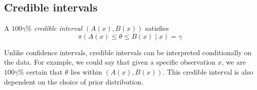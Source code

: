 \subsection{Credible intervals}
\begin{definition}
	A \( 100\gamma \)\% \textit{credible interval} \( (A(x), B(x)) \) satisfies
	\[ \pi(A(x) \leq \theta \leq B(x) \mid x) = \gamma \]
\end{definition}
\begin{remark}
	Unlike confidence intervals, credible intervals can be interpreted conditionally on the data.
	For example, we could say that given a specific observation \( x \), we are \( 100 \gamma \)\% certain that \( \theta \) lies within \( (A(x), B(x)) \).
	This credible interval is also dependent on the choice of prior distribution.
\end{remark}
